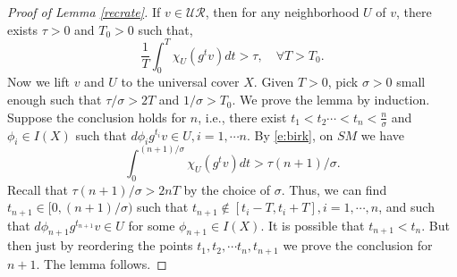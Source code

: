 \documentclass[11pt]{amsart}
\theoremstyle{definition}
\newcommand{\UR}{\mathcal{UR}}
\begin{document}
\begin{proof}[Proof of Lemma \ref{recrate}]
If $v\in \UR$, then for any neighborhood $U$ of $v$, there exists $\tau>0$ and $T_0>0$ such that,
\begin{equation}\label{e:birk}
\frac{1}{T}\int_0^T\chi_U(g^tv)dt>\tau, \quad \forall T>T_0.
\end{equation}
Now we lift $v$ and $U$ to the universal cover $X$. Given $T>0$, pick $\sigma>0$ small enough such that $\tau/\sigma>2T$ and $1/\sigma>T_0$.
We prove the lemma by induction. Suppose the conclusion holds for $n$, i.e., there exist $t_1<t_2 \cdots<t_n<\frac{n}{\sigma}$ and $\phi_i\in I(X)$ such that $d \phi_i g^{t_i}v\in U, i=1,\cdots n$. By \eqref{e:birk}, on $SM$ we have
$$\int_0^{(n+1)/\sigma}\chi_U(g^tv)dt>\tau(n+1)/\sigma.$$
Recall that $\tau(n+1)/\sigma>2nT$ by the choice of $\sigma$. Thus, we can find $t_{n+1}\in [0, (n+1)/\sigma)$ such that $t_{n+1}\notin [t_i-T,t_i+T], i=1, \cdots, n$, and such that
$d \phi_{n+1} g^{t_{n+1}}v\in U$
for some $\phi_{n+1}\in I(X)$. It is possible that $t_{n+1}<t_n$. But then just by reordering the points  $t_1,t_2, \cdots t_n, t_{n+1}$ we prove the conclusion for $n+1$. The lemma follows.
\end{proof}
\end{document}
